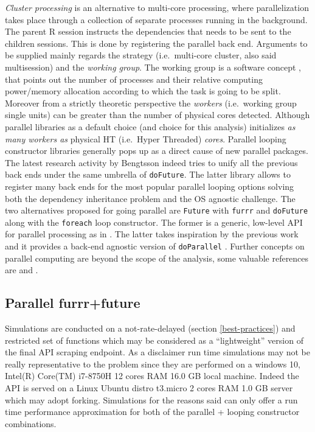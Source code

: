 \documentclass[
  12pt,
  a4paper,
  oneside]{book}
\newcommand{\passthrough}[1]{#1}
\theoremstyle{definition}
\theoremstyle{definition}
\theoremstyle{definition}
\theoremstyle{remark}
\begin{document}
\emph{Cluster processing} is an alternative to multi-core processing, where parallelization takes place through a collection of separate processes running in the background. The parent R session instructs the dependencies that needs to be sent to the children sessions.
This is done by registering the parallel back end. Arguments to be supplied mainly regards the strategy (i.e.~multi-core cluster, also said multisession) and the \emph{working group}. The working group is a software concept \citep{parallelr}, that points out the number of processes and their relative computing power/memory allocation according to which the task is going to be split. Moreover from a strictly theoretic perspective the \emph{workers} (i.e.~working group single units) can be greater than the number of physical cores detected. Although parallel libraries as a default choice (and choice for this analysis) initializes \emph{as many workers as} physical HT (i.e.~Hyper Threaded) \emph{cores}.
Parallel looping constructor libraries generally pops up as a direct cause of new parallel packages. The latest research activity by Bengtsson \citet{doFuture} indeed tries to unify all the previous back ends under the same umbrella of \passthrough{\lstinline!doFuture!}. The latter library allows to register many back ends for the most popular parallel looping options solving both the dependency inheritance problem and the OS agnostic challenge.
The two alternatives proposed for going parallel are \passthrough{\lstinline!Future!} \citet{future} with \passthrough{\lstinline!furrr!} \citet{furrr} and \passthrough{\lstinline!doFuture!} \citeyearpar{doFuture} along with the \passthrough{\lstinline!foreach!} \citet{foreach} loop constructor. The former is a generic, low-level API for parallel processing as in \citet{bengtsson_2017}. The latter takes inspiration by the previous work and it provides a back-end agnostic version of \passthrough{\lstinline!doParallel!} \citet{doParallel}. Further concepts on parallel computing are beyond the scope of the analysis, some valuable references are \citet{barney} and \citet{parallelr}.

\hypertarget{parallel-furrrfuture}{%
\subsection{Parallel furrr+future}\label{parallel-furrrfuture}}

Simulations are conducted on a not-rate-delayed (section \ref{best-practices}) and restricted set of functions which may be considered as a ``lightweight'' version of the final API scraping endpoint.
As a disclaimer run time simulations may not be really representative to the problem since they are performed on a windows 10, Intel(R) Core(TM) i7-8750H 12 cores RAM 16.0 GB local machine. Indeed the API is served on a Linux Ubuntu distro t3.micro 2 cores RAM 1.0 GB server which may adopt forking. Simulations for the reasons said can only offer a run time performance approximation for both of the parallel + looping constructor combinations.
\end{document}
